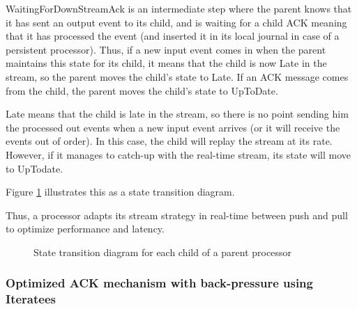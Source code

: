WaitingForDownStreamAck is an intermediate step where the parent knows that it has sent an output event to its child, and is waiting for a child ACK meaning that it has
processed the event (and inserted it in its local journal in case of a persistent processor). Thus, if a new input event comes in when the parent maintains this state
for its child, it means that the child is now Late in the stream, so the parent moves the child's state to Late. If an ACK message comes from the child, the parent moves the
child's state to UpToDate.

Late means that the child is late in the stream, so there is no point sending him the processed out events when a new input event arrives (or it will receive the events out of order).
In this case, the child will replay the stream at its rate. However, if it manages to catch-up with the real-time stream, its state will move to UpTodate.

Figure \ref{fig:childstates} illustrates this as a state transition diagram.

Thus, a processor adapts its stream strategy in real-time between push and pull to optimize performance and latency.

\begin{figure}[h]
  \begin{center} 
    \caption{State transition diagram for each child of a parent processor}
    \label{fig:childstates}
  \end{center}
\end{figure}

\subsubsection{Optimized ACK mechanism with back-pressure using Iteratees}

